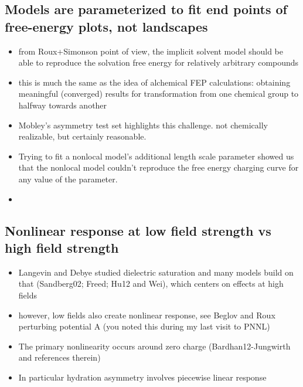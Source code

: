 \documentclass[reprint, letterpaper, nobibnotes, aps, superscriptaddress,prb]{revtex4-1}
\begin{document}
\subsection{Models are parameterized to fit end points of free-energy plots, not landscapes}

\begin{itemize}
\item from Roux+Simonson point of view, the implicit solvent model should be able to reproduce the solvation free energy for relatively arbitrary compounds
\item this is much the same as the idea of alchemical FEP calculations: obtaining meaningful (converged) results for transformation from one chemical group to halfway towards another
\item Mobley's asymmetry test set highlights this challenge. not chemically realizable, but certainly reasonable.
\item Trying to fit a nonlocal model's additional length scale parameter showed us that the nonlocal model couldn't reproduce the free energy charging curve for any value of the parameter.
\item 
\end{itemize}

\subsection{Nonlinear response at low field strength vs high field strength}

\begin{itemize}
\item Langevin and Debye studied dielectric saturation and many models build on that (Sandberg02; Freed; Hu12 and Wei), which centers on effects at high fields
\item however, low fields also create nonlinear response, see Beglov and Roux perturbing potential A (you noted this during my last visit to PNNL)
\item The primary nonlinearity occurs around zero charge (Bardhan12-Jungwirth and references therein)
\item In particular hydration asymmetry involves piecewise linear response
\end{itemize}
\end{document}
